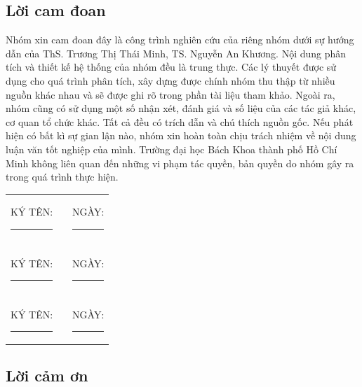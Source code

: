 \documentclass[a4paper, oneside, 12pt]{report}
\theoremstyle{definition}
\begin{document}
\setlength{\parskip}{2.5mm}
\thispagestyle{plain}
	\begin{center}
		\section*{Lời cam đoan}
	\end{center}
	
	Nhóm xin cam đoan đây là công trình nghiên cứu của riêng nhóm dưới sự hướng dẫn của ThS. Trương Thị Thái Minh, TS. Nguyễn An Khương. Nội dung phân tích và thiết kế hệ thống của nhóm đều là trung thực. Các lý thuyết được sử dụng cho quá trình phân tích, xây dựng được chính nhóm thu thập từ nhiều nguồn khác nhau và sẽ được ghi rõ trong phần tài liệu tham khảo. Ngoài ra, nhóm cũng có sử dụng một số nhận xét, đánh giá và số liệu của các tác giả khác, cơ quan tổ chức khác. Tất cả đều có trích dẫn và chú thích nguồn gốc. Nếu phát hiện có bất kì sự gian lận nào, nhóm xin hoàn toàn chịu trách nhiệm về nội dung luận văn tốt nghiệp của mình. Trường đại học Bách Khoa thành phố Hồ Chí Minh không liên quan đến những vi phạm tác quyền, bản quyền do nhóm gây ra trong quá trình thực hiện.
	
	\vspace{1cm}
	
	\begin{center}
		\begin{tabular}{c c c}
			KÝ TÊN: \rule{4cm}{0.15mm} &\hspace{4cm}& NGÀY: \rule{4cm}{0.15mm} \\ \\
			KÝ TÊN: \rule{4cm}{0.15mm} &\hspace{4cm}& NGÀY: \rule{4cm}{0.15mm} \\ \\
			KÝ TÊN: \rule{4cm}{0.15mm} &\hspace{4cm}& NGÀY: \rule{4cm}{0.15mm}
		\end{tabular}
	\end{center}
\setlength{\parskip}{0mm}

\newpage

\setlength{\parskip}{2.5mm}
\thispagestyle{plain}
	\begin{center}
		\section*{Lời cảm ơn}
	\end{center}
	
\end{document}
